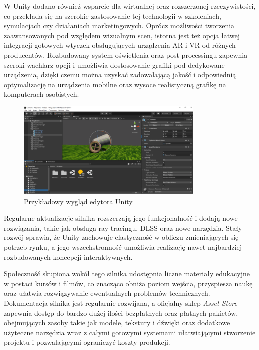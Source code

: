 W Unity dodano również wsparcie dla wirtualnej oraz rozszerzonej rzeczywistości, co przekłada się na szerokie zastosowanie tej technologii w szkoleniach, symulacjach czy działaniach marketingowych. Oprócz możliwości tworzenia zaawansowanych pod względem wizualnym scen, istotna jest też opcja łatwej integracji gotowych wtyczek obsługujących urządzenia AR i VR od różnych producentów. Rozbudowany system oświetlenia oraz post-processingu zapewnia szeroki wachlarz opcji i umożliwia dostosowanie grafiki pod dedykowane urządzenia, dzięki czemu można uzyskać zadowalającą jakość i odpowiednią optymalizację na urządzenia mobilne oraz wysoce realistyczną grafikę na komputerach osobistych.

\begin{figure}[!htb]
    \centering
    \includegraphics[width=0.8\textwidth]{images/unity.png}
    \caption{Przykładowy wygląd edytora Unity}
    \label{unity_engine_example}
\end{figure}

Regularne aktualizacje silnika rozszerzają jego funkcjonalność i dodają nowe rozwiązania, takie jak obsługa ray tracingu, DLSS oraz nowe narzędzia. Stały rozwój sprawia, że Unity zachowuje elastyczność w obliczu zmieniających się potrzeb rynku, a jego wszechstronność umożliwia realizację nawet najbardziej rozbudowanych koncepcji interaktywnych.

Społeczność skupiona wokół tego silnika udostępnia liczne materiały edukacyjne w postaci kursów i filmów, co znacząco obniża poziom wejścia, przyspiesza naukę oraz ułatwia rozwiązywanie ewentualnych problemów technicznych. Dokumentacja silnika jest regularnie rozwijana, a oficjalny sklep \textit{Asset Store} zapewnia dostęp do bardzo dużej ilości bezpłatnych oraz płatnych pakietów, obejmujących zasoby takie jak modele, tekstury i dźwięki oraz dodatkowe użyteczne narzędzia wraz z całymi gotowymi systemami ułatwiającymi stworzenie projektu i pozwalającymi ograniczyć koszty produkcji.


